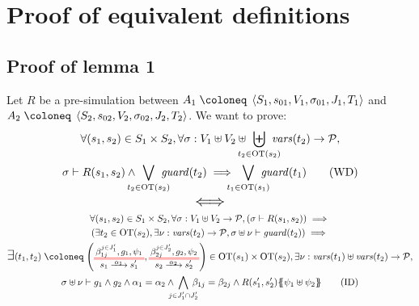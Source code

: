\documentclass{article}
\begin{document}
\section{Proof of equivalent definitions}\label{apx:lemeqd}

\subsection{Proof of lemma 1}
Let \(R\) be a pre-simulation between \(A_1 \defobject \OA{S_1}{s_{01}}{V_1}{\sigma_{01}}{J_1}{T_1}\) and \(A_2 \defobject \OA{S_2}{s_{02}}{V_2}{\sigma_{02}}{J_2}{T_2}\).
We want to prove:
\begin{multline}
	\forall \mpar{s_1, s_2} \in S_1 \times S_2, \forall \sigma: V_1 \uplus V_2 \uplus \biguplus_\subbox{t_2 \in \fOT{s_2}} \fvars{t_2} \to \values, \\
	\sigma \vdash R\mpar{s_1, s_2} \wedge \bigvee_\subbox{t_2 \in \fOT{s_2}} \fguard{t_2} \implies \bigvee_\subbox{t_1 \in \fOT{s_1}} \fguard{t_1} \tag{WD}\label{eq:drWD}
\end{multline}
\[ \text{\Large\(\displaystyle \iff\)} \]
\begin{multline}
	\forall \mpar{s_1, s_2} \in S_1 \times S_2, \forall \sigma: V_1 \uplus V_2 \to \values, \mpar{\sigma \vdash R\mpar{s_1, s_2}} \implies \\
	\mpar{\exists t_2 \in \fOT{s_2}, \exists \nu: \fvars{t_2} \to \values, \sigma \uplus \nu \vdash \fguard{t_2}} \implies \\
	\bigsymb{\exists} \mpar{t_1, t_2} \defobject \mpar{\OTx{1}{}{1}{1}, \OTx{2}{}{2}{2}} \in \fOT{s_1} \times \fOT{s_2}, \exists \nu: \fvars{t_1} \uplus \fvars{t_2} \to \values, \\
	\sigma \uplus \nu \vdash g_1 \wedge g_2 \wedge \alpha_1 = \alpha_2 \wedge \bigwedge_\subbox{j \in J'_1 \cap J'_2} \beta_{1j} = \beta_{2j} \wedge R\mpar{s'_1, s'_2}\psubst{\psi_1 \uplus \psi_2}\tag{ID}\label{eq:drID}
\end{multline}
\end{document}
